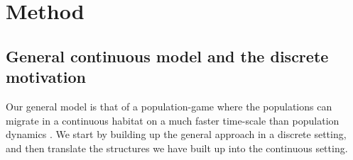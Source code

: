 \section{Method}

\subsection{General continuous model and the discrete motivation}
\label{sec:gen_model}

Our general model is that of a population-game \citep{kvrivan2009evolutionary} where the populations can migrate in a continuous habitat on a much faster time-scale than population dynamics \citep{cressman2006migration}. We start by building up the general approach in a discrete setting, and then translate the structures we have built up into the continuous setting.

